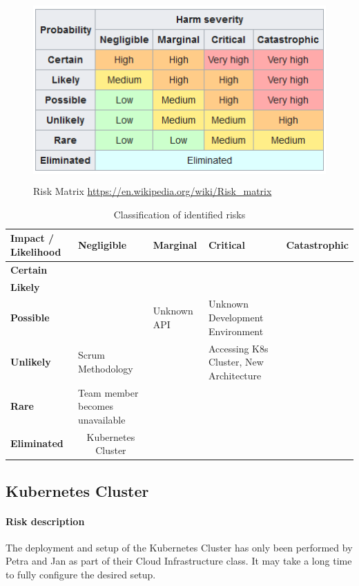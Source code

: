 \begin{figure}[h]
    \centering
    \includegraphics[height=7cm]{resources/risk-matrix.png}
    \caption{Risk Matrix \url{https://en.wikipedia.org/wiki/Risk_matrix}}
    \label{fig:risk-matrix}
\end{figure}


\begin{table}[h]
    \caption{Classification of identified risks}
    \label{tab:risk-classification}
    \begin{tabular*}{\textwidth}{ p{2.2cm} | p{3cm} | p{2cm} | p{3.5cm} | p{2cm} }
        \textbf{Impact / Likelihood} & \textbf{Negligible} & \textbf{Marginal} & \textbf{Critical} & \textbf{Catastrophic} \\ \hline
        \textbf{Certain}     & & & & \\ \hline
        \textbf{Likely}      & & & & \\ \hline
        \textbf{Possible}    & & Unknown API & Unknown Development Environment & \\ \hline
        \textbf{Unlikely}    & Scrum Methodology & & Accessing K8s Cluster, New Architecture & \\ \hline
        \textbf{Rare}        & Team member becomes unavailable & & & \\ \hline
        \textbf{Eliminated}  & \multicolumn{1}{c}{Kubernetes Cluster} \\ \hline
    \end{tabular*}
\end{table}

\subsection{Kubernetes Cluster}
\paragraph{Risk description} The deployment and setup of the Kubernetes Cluster has only been performed by Petra and Jan as part of their Cloud Infrastructure class. It may take a long time to fully configure the desired setup.
